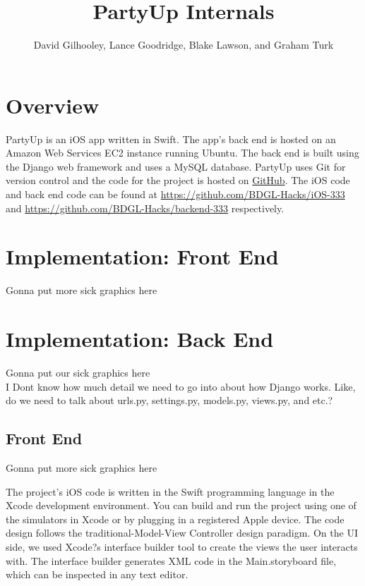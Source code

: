 \documentclass[12pt]{article}
\title{PartyUp Internals}
\author{David Gilhooley, Lance Goodridge, Blake Lawson, and Graham Turk}
\begin{document}
\pagestyle{plain}

\maketitle

\section{Overview}

PartyUp is an iOS app written in Swift.
The app's back end is hosted on an Amazon Web Services
EC2 instance running Ubuntu.
The back end is built using the Django web framework and uses
a MySQL database.
PartyUp uses Git for version control and the code for the project is 
hosted on \href{https://github.com/}{GitHub}.
The iOS code and back end code can be found at 
\url{https://github.com/BDGL-Hacks/iOS-333} and
\url{https://github.com/BDGL-Hacks/backend-333} respectively.


\section{Implementation: Front End}

Gonna put more sick graphics here

\section{Implementation: Back End}

Gonna put our sick graphics here \\
I Dont know how much detail we need to go into about how
Django works. Like, do we need to talk about urls.py, settings.py,
models.py, views.py, and etc.?

\subsection{Front End}

Gonna put more sick graphics here

The project's iOS code is written in the Swift programming language in the Xcode development environment. You can build and run the project using one of the simulators in Xcode or by plugging in a registered Apple device. The code design follows the traditional-Model-View Controller design paradigm. On the UI side, we used Xcode?s interface builder tool to create the views the user interacts with. The interface builder generates XML code in the Main.storyboard file, which can be inspected in any text editor.
\end{document}
